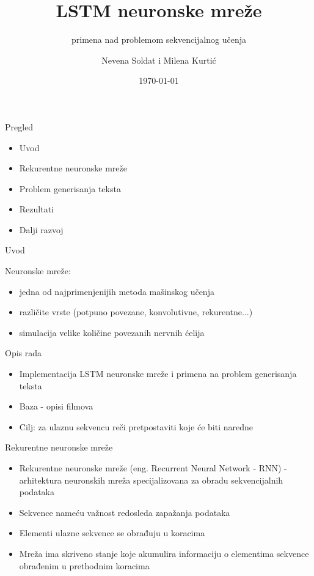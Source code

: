 \documentclass[table]{beamer}
\title[LSTM neuronske mreže]{\textbf{LSTM neuronske mreže}}
\subtitle{primena nad problemom sekvencijalnog učenja}
\author{Nevena Soldat i Milena Kurtić}
\institute{Matematički fakultet, Univerzitet u Beogradu}
\date{\today}
\begin{document}
\frame{\titlepage}


\begin{frame}{Pregled}

\begin{itemize}
    \item Uvod
    \item Rekurentne neuronske mreže
    \item Problem generisanja teksta
    \item Rezultati
    \item Dalji razvoj
\end{itemize}

\end{frame}


\begin{frame}{Uvod}

Neuronske mreže:

\begin{itemize}
    \item jedna od najprimenjenijih metoda mašinskog učenja
    \item različite vrste (potpuno povezane, konvolutivne, rekurentne...)
    \item simulacija velike količine povezanih nervnih ćelija
\end{itemize}

\end{frame}

\begin{frame}{Opis rada}
\begin{itemize}
    \item Implementacija LSTM neuronske mreže i primena na problem generisanja teksta
    \item Baza - opisi filmova
    \item Cilj: za ulaznu sekvencu reči pretpostaviti koje će biti naredne
\end{itemize}
    
\end{frame}

\begin{frame}{Rekurentne neuronske mreže}

\begin{itemize}
\item Rekurentne neuronske mreže (eng. Recurrent Neural Network - RNN) - arhitektura neuronskih mreža specijalizovana za obradu sekvencijalnih podataka
\item Sekvence nameću važnost redosleda zapažanja podataka
\item Elementi ulazne sekvence se obrađuju u koracima
\item Mreža ima skriveno stanje koje akumulira informaciju o elementima sekvence obrađenim u prethodnim koracima
\end{itemize}
    
\end{frame}
\end{document}
